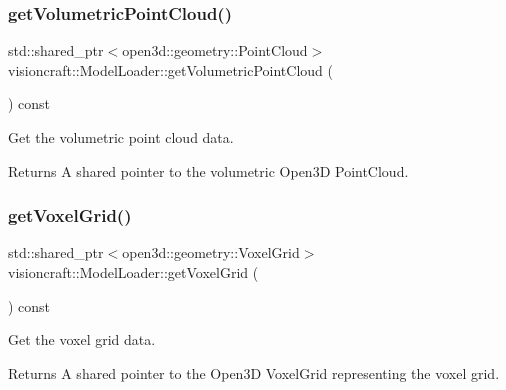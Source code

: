 \subsubsection{\texorpdfstring{get\+Volumetric\+Point\+Cloud()}{getVolumetricPointCloud()}}
{\footnotesize\ttfamily std\+::shared\+\_\+ptr$<$open3d\+::geometry\+::\+Point\+Cloud$>$ visioncraft\+::\+Model\+Loader\+::get\+Volumetric\+Point\+Cloud (\begin{DoxyParamCaption}{ }\end{DoxyParamCaption}) const\hspace{0.3cm}{\ttfamily [inline]}}



Get the volumetric point cloud data. 

\begin{DoxyReturn}{Returns}
A shared pointer to the volumetric Open3D Point\+Cloud. 
\end{DoxyReturn}
\mbox{\label{classvisioncraft_1_1ModelLoader_ad13c4d532926aecf7e4247306a283531}} 
\subsubsection{\texorpdfstring{get\+Voxel\+Grid()}{getVoxelGrid()}}
{\footnotesize\ttfamily std\+::shared\+\_\+ptr$<$open3d\+::geometry\+::\+Voxel\+Grid$>$ visioncraft\+::\+Model\+Loader\+::get\+Voxel\+Grid (\begin{DoxyParamCaption}{ }\end{DoxyParamCaption}) const\hspace{0.3cm}{\ttfamily [inline]}}



Get the voxel grid data. 

\begin{DoxyReturn}{Returns}
A shared pointer to the Open3D Voxel\+Grid representing the voxel grid. 
\end{DoxyReturn}
\mbox{\label{classvisioncraft_1_1ModelLoader_a19e1a6ec780cc1eaee022840e72302e4}} 
